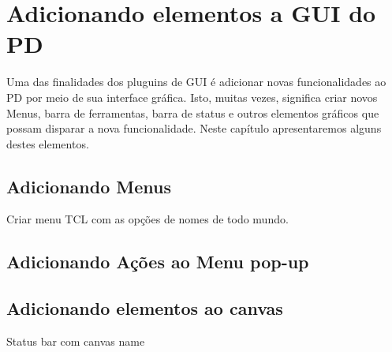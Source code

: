 \chapter{Adicionando elementos a GUI do PD}


Uma das finalidades dos pluguins de GUI é adicionar novas funcionalidades ao
PD por meio de sua interface gráfica.
Isto, muitas vezes, significa criar novos Menus, barra de ferramentas, barra
de status e outros elementos gráficos que possam disparar a nova funcionalidade.
Neste capítulo apresentaremos alguns destes elementos.


\section{Adicionando Menus}

Criar menu TCL com as opções de nomes de todo mundo.

\section{Adicionando Ações ao Menu pop-up}


\section{Adicionando elementos ao canvas}

Status bar com canvas name


